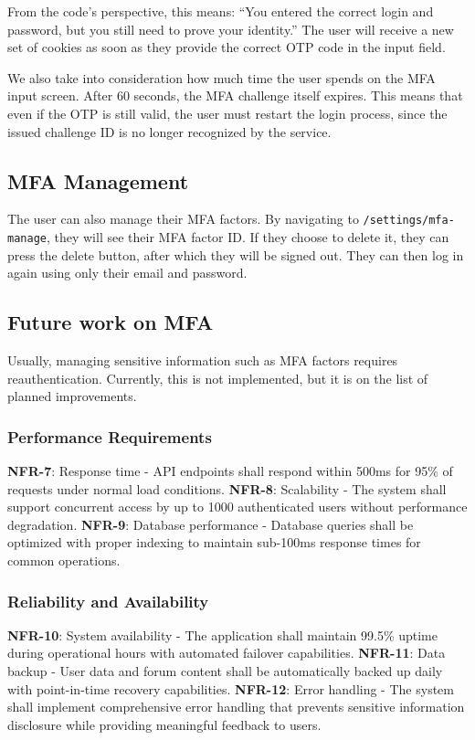 From the code’s perspective, this means: “You entered the correct login and password, but you still need to prove your identity.”
The user will receive a new set of cookies as soon as they provide the correct OTP code in the input field.

We also take into consideration how much time the user spends on the MFA input screen. After 60 seconds, the MFA challenge itself expires. This means that even if the OTP is still valid, the user must restart the login process, since the issued challenge ID is no longer recognized by the service.

\subsection*{MFA Management}

The user can also manage their MFA factors. By navigating to \texttt{/settings/mfa-manage}, they will see their MFA factor ID.
If they choose to delete it, they can press the delete button, after which they will be signed out.
They can then log in again using only their email and password.

\subsection*{Future work on MFA}

Usually, managing sensitive information such as MFA factors requires reauthentication.
Currently, this is not implemented, but it is on the list of planned improvements.


\subsubsection{Performance Requirements}

     \textbf{NFR-7}: Response time - API endpoints shall respond within 500ms for 95\% of requests under normal load conditions.
     \textbf{NFR-8}: Scalability - The system shall support concurrent access by up to 1000 authenticated users without performance degradation.
     \textbf{NFR-9}: Database performance - Database queries shall be optimized with proper indexing to maintain sub-100ms response times for common operations.


\subsubsection{Reliability and Availability}

     \textbf{NFR-10}: System availability - The application shall maintain 99.5\% uptime during operational hours with automated failover capabilities.
     \textbf{NFR-11}: Data backup - User data and forum content shall be automatically backed up daily with point-in-time recovery capabilities.
     \textbf{NFR-12}: Error handling - The system shall implement comprehensive error handling that prevents sensitive information disclosure while providing meaningful feedback to users.


